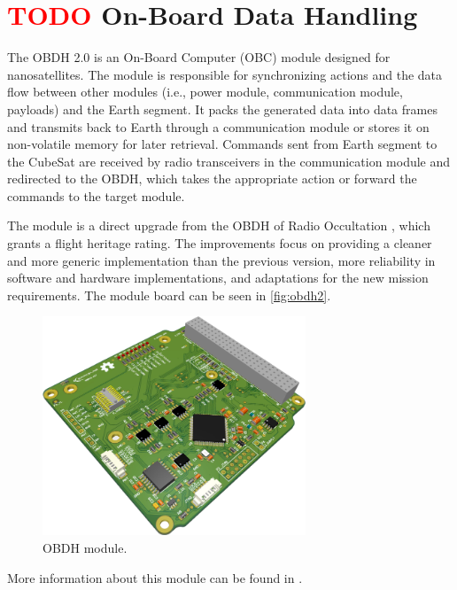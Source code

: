 \section{ \textcolor{red}{TODO} On-Board Data Handling}

The OBDH 2.0 is an On-Board Computer (OBC) module designed for nanosatellites. The module is responsible for synchronizing actions and the data flow between other modules (i.e., power module, communication module, payloads) and the Earth segment. It packs the generated data into data frames and transmits back to Earth through a communication module or stores it on non-volatile memory for later retrieval. Commands sent from Earth segment to the CubeSat are received by radio transceivers in the communication module and redirected to the OBDH, which takes the appropriate action or forward the commands to the target module.

The module is a direct upgrade from the OBDH of Radio Occultation \cite{floripasat}, which grants a flight heritage rating. The improvements focus on providing a cleaner and more generic implementation than the previous version, more reliability in software and hardware implementations, and adaptations for the new mission requirements. The module board can be seen in \autoref{fig:obdh2}.

\begin{figure}[!ht]
    \begin{center}
        \includegraphics[width=0.7\textwidth]{figures/subsystems/obdh2-pcb-3d}
        \caption{OBDH module.}
        \label{fig:obdh2}
    \end{center}
\end{figure}

More information about this module can be found in \cite{obdh2}.

